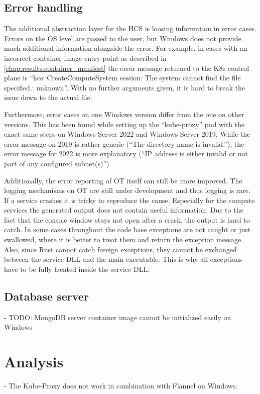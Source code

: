 \subsection{Error handling}
The additional abstraction layer for the \ac{HCS} is loosing information in error cases. Errors on the \ac{OS} level are passed to the user, but \ac{Windows} does not provide much additional information alongside the error. For example, in cases with an incorrect container image entry point as described in \autoref{chap:results.container_manifest} the error message returned to the \ac{K8s} control plane is \enquote{hcs::CreateComputeSystem session: The system cannot find the file specified.: unknown}. With no further arguments given, it is hard to break the issue down to the actual file.

Furthermore, error cases on one \ac{Windows} version differ from the one on other versions. This has been found while setting up the \enquote{kube-proxy} pod with the exact same steps on Windows Server 2022 and Windows Server 2019. While the error message on 2019 is rather generic (\enquote{The directory name is invalid.}), the error message for 2022 is more explanatory (\enquote{IP address is either invalid or not part of any configured subnet(s)}).

Additionally, the error reporting of \ac{OT} itself can still be more improved. The logging mechanisms on \ac{OT} are still under development and thus logging is rare. If a service crashes it is tricky to reproduce the cause. Especially for the compute services the generated output does not contain useful information. Due to the fact that the console window stays not open after a crash, the output is hard to catch.
In some cases throughout the code base exceptions are not caught or just swallowed, where it is better to treat them and return the exception message.
Also, since Rust cannot catch foreign exceptions, they cannot be exchanged between the service \ac{DLL} and the main executable. This is why all exceptions have to be fully treated inside the service \ac{DLL}. 


\subsection{Database server}

- TODO: MongoDB server container image cannot be initialized easily on Windows



\section{Analysis}
- The Kube-Proxy does not work in combination with Flannel on \ac{Windows}.  %
